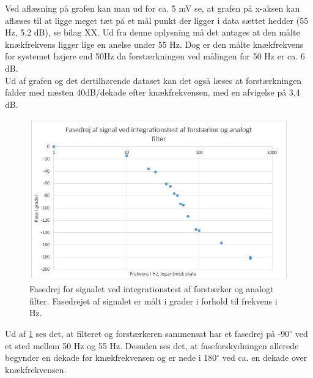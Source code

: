 Ved aflæsning på grafen kan man ud for ca. 5 mV se, at grafen på x-aksen kan aflæses til at ligge meget tæt på et mål punkt der ligger i data sættet hedder (55 Hz, 5,2 dB), se bilag XX. Ud fra denne oplysning må det antages at den målte knækfrekvens ligger lige en anelse under 55 Hz. Dog er den målte knækfrekvens for systemet højere end 50Hz da forstærkningen ved målingen for 50 Hz er ca. 6 dB.\\
Ud af grafen og det dertilhørende dataset kan det også læses at forstærkningen falder med næsten 40dB/dekade efter knækfrekvensen, med en afvigelse på 3,4 dB.\\
\begin{figure}[H]
	\centering
	\includegraphics[width=1\textwidth]{Figurer/Hardware/FaseForstaerkerFilter}
	\caption{Fasedrej for signalet ved integrationstest af forstærker og analogt filter. Fasedrejet af signalet er målt i grader i forhold til frekvens i Hz.}
	\label{fig:FaseForstaerkerFilter}
\end{figure}
Ud af \ref{fig:FaseForstaerkerFilter} ses det, at filteret og forstærkeren sammensat har et fasedrej på -90$^{\circ}$ ved et sted mellem 50 Hz og 55 Hz. Desuden ses det, at faseforskydningen allerede begynder en dekade før knækfrekvensen og er nede i 180$^{\circ}$ ved ca. en dekade over knækfrekvensen.

